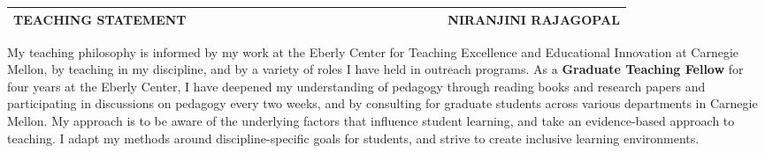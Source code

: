 \documentclass[10pt]{article}
\date{}
\begin{document}
\begin{table}
\color{blue}
\begin{tabular*}{\textwidth}{l r}
\large\textbf{TEACHING STATEMENT} & 
\hfill \ \ \ \ \ \ \ \ \ \ \ \ \ \ \ \ \ \ \ \
\ \ \ \ \ \ \ \ \ \ \ \ \ \ \ 
\large\textbf{NIRANJINI RAJAGOPAL}\\
\hline
\end{tabular*}

\end{table}




My teaching philosophy is informed by my work at the Eberly Center for Teaching Excellence and Educational Innovation at Carnegie Mellon, by teaching in my discipline, and by a variety of roles I have held in outreach programs. As a \textbf{Graduate Teaching Fellow} for four years at the Eberly Center, I have deepened my understanding of pedagogy through reading books and research papers and participating in discussions on pedagogy every two weeks, and %
by consulting for graduate students 
across various departments in Carnegie Mellon. 
My approach is to be aware of the underlying factors that influence student learning, and take an evidence-based approach to teaching. I adapt my methods around discipline-specific goals for students, and strive to create inclusive learning environments. 
\\%
\end{document}
